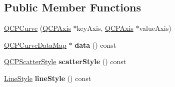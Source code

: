 \subsection*{\-Public \-Member \-Functions}
\begin{DoxyCompactItemize}
\item 
\hyperlink{classQCPCurve_a36de58e2652b3fa47bdf9187d421d3ce}{\-Q\-C\-P\-Curve} (\hyperlink{classQCPAxis}{\-Q\-C\-P\-Axis} $\ast$key\-Axis, \hyperlink{classQCPAxis}{\-Q\-C\-P\-Axis} $\ast$value\-Axis)
\item 
\hypertarget{classQCPCurve_a9ac194d35d4f334923aac9df1bf599ca}{\hyperlink{qcustomplot_8h_a444d37ec9cb2951b3a7fe443c34d1658}{\-Q\-C\-P\-Curve\-Data\-Map} $\ast$ {\bfseries data} () const }\label{classQCPCurve_a9ac194d35d4f334923aac9df1bf599ca}

\item 
\hypertarget{classQCPCurve_a9ab864c9f6ba0cedf65853f59d867a68}{\hyperlink{classQCPScatterStyle}{\-Q\-C\-P\-Scatter\-Style} {\bfseries scatter\-Style} () const }\label{classQCPCurve_a9ab864c9f6ba0cedf65853f59d867a68}

\item 
\hypertarget{classQCPCurve_a0314dd644258949aeb4a95cebde5abaf}{\hyperlink{classQCPCurve_a2710e9f79302152cff794c6e16cc01f1}{\-Line\-Style} {\bfseries line\-Style} () const }\label{classQCPCurve_a0314dd644258949aeb4a95cebde5abaf}


\end{DoxyCompactItemize}
